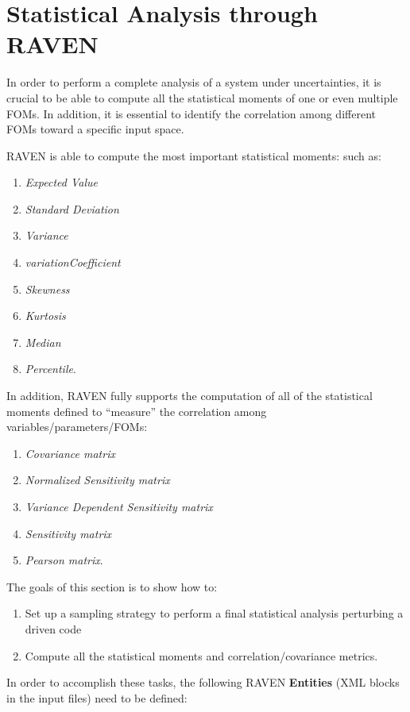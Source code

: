 \section{Statistical Analysis through RAVEN}
\label{sec:SAraven}
In order to perform a complete analysis of a system under uncertainties,
it is crucial to be able to compute all the statistical moments of one or even multiple
FOMs. In addition, it is essential to identify the correlation
among different FOMs toward a specific input space.

RAVEN is able to compute the most important statistical moments:
such as:
\begin{enumerate}
  \item \textit{Expected Value}
  \item \textit{Standard Deviation}
  \item \textit{Variance}
  \item \textit{variationCoefficient}
  \item \textit{Skewness}
  \item \textit{Kurtosis}
  \item \textit{Median}
  \item \textit{Percentile}.
\end{enumerate}
In addition, RAVEN fully supports the computation of all of the statistical moments defined to
``measure'' the correlation among variables/parameters/FOMs:
\begin{enumerate}
  \item \textit{Covariance matrix}
  \item \textit{Normalized Sensitivity  matrix}
  \item \textit{Variance Dependent Sensitivity  matrix}
  \item \textit{Sensitivity matrix}
  \item \textit{Pearson matrix}.
\end{enumerate}
The goals of this section is to show how to:
 \begin{enumerate}
   \item Set up a sampling strategy to perform a final statistical analysis
   perturbing a driven code
   \item Compute all the statistical moments and correlation/covariance
   metrics.
\end{enumerate}
In order to accomplish these tasks, the following RAVEN \textbf{Entities} (XML blocks in the input files) need to be defined:
